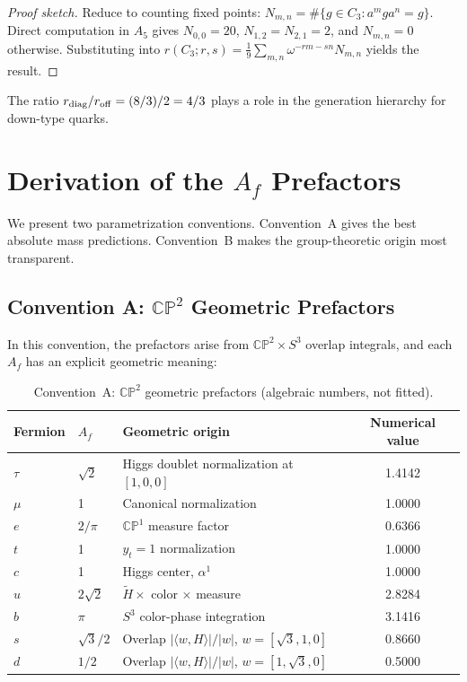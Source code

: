 \documentclass[11pt,a4paper]{article}
\newcommand{\CP}{\mathbb{CP}}
\theoremstyle{definition}
\theoremstyle{remark}
\begin{document}
\begin{proof}[Proof sketch]
Reduce to counting fixed points: $N_{m,n} = \#\{g \in C_3 : a^m g a^n = g\}$.
Direct computation in $A_5$ gives $N_{0,0}=20$, $N_{1,2}=N_{2,1}=2$,
and $N_{m,n}=0$ otherwise.  Substituting into
$r(C_3;r,s) = \frac{1}{9}\sum_{m,n}\omega^{-rm-sn}N_{m,n}$ yields the result.
\end{proof}

The ratio $r_{\rm diag}/r_{\rm off} = (8/3)/2 = 4/3$ plays a role in the
generation hierarchy for down-type quarks.

\section{Derivation of the $A_f$ Prefactors}
\label{sec:Af}

We present two parametrization conventions.  Convention~A gives the best
absolute mass predictions.  Convention~B makes the group-theoretic origin
most transparent.

\subsection{Convention A: $\CP^2$ Geometric Prefactors}

In this convention, the prefactors arise from $\CP^2 \times S^3$ overlap
integrals, and each $A_f$ has an explicit geometric meaning:

\begin{table}[h]
\centering
\begin{tabular}{lllc}
\toprule
Fermion & $A_f$ & Geometric origin & Numerical value \\
\midrule
$\tau$ & $\sqrt{2}$ & Higgs doublet normalization at $[1,0,0]$ & 1.4142 \\
$\mu$ & 1 & Canonical normalization & 1.0000 \\
$e$ & $2/\pi$ & $\CP^1$ measure factor & 0.6366 \\
$t$ & 1 & $y_t = 1$ normalization & 1.0000 \\
$c$ & 1 & Higgs center, $\alpha^1$ & 1.0000 \\
$u$ & $2\sqrt{2}$ & $\tilde{H} \times$ color $\times$ measure & 2.8284 \\
$b$ & $\pi$ & $S^3$ color-phase integration & 3.1416 \\
$s$ & $\sqrt{3}/2$ & Overlap $|\langle w,H\rangle|/|w|$, $w=[\sqrt{3},1,0]$ & 0.8660 \\
$d$ & $1/2$ & Overlap $|\langle w,H\rangle|/|w|$, $w=[1,\sqrt{3},0]$ & 0.5000 \\
\bottomrule
\end{tabular}
\caption{Convention~A: $\CP^2$ geometric prefactors (algebraic numbers, not fitted).}
\label{tab:Af_geometric}
\end{table}
\end{document}
